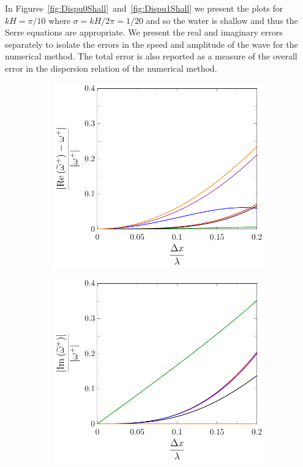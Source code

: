 In Figures~\ref{fig:Dispu0Shall}~and~\ref{fig:Dispu1Shall} we present the plots for $kH = \pi / 10$ where $\sigma = kH / 2\pi =  1 / 20$ and so the water is shallow and thus the Serre equations are appropriate. We present the real and imaginary errors separately to isolate the errors in the speed and amplitude of the wave for the numerical method. The total error is also reported as a measure of the overall error in the dispersion relation of the numerical method. 

\begin{figure}
	\centering
	\begin{subfigure}{0.5\textwidth}
		\includegraphics[width=\textwidth]{./chp4/figures/New/ReDispu0Shall.pdf}
	\end{subfigure}%
	\begin{subfigure}{0.5\textwidth}
		\includegraphics[width=\textwidth]{./chp4/figures/New/ImDispu0Shall.pdf}

\end{subfigure}
\end{figure}
